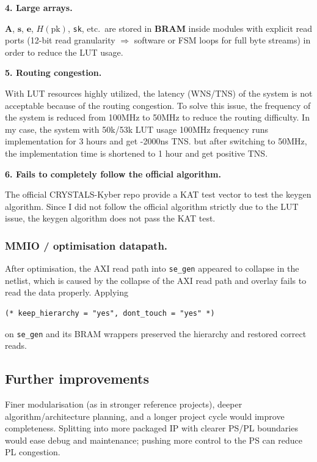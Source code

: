\documentclass[11pt,a4paper]{article}
\begin{document}
\medskip
\noindent \textbf{4. Large arrays.}

\noindent $\mathbf{A}$, $\mathbf{s}$, $\mathbf{e}$, $H(\mathrm{pk})$, \texttt{sk}, etc.\ are stored in \textbf{BRAM} inside modules with explicit read ports (12-bit read granularity $\Rightarrow$ software or FSM loops for full byte streams) in order to reduce the LUT usage.

\medskip
\noindent \textbf{5. Routing congestion.}

\noindent With LUT resources highly utilized, the latency (WNS/TNS) of the system is not acceptable because of the routing congestion. To solve this issue, the frequency of the system is reduced from 100MHz to 50MHz to reduce the routing difficulty. 
In my case, the system with 50k/53k LUT usage 100MHz frequency runs implementation for 3 hours and get -2000ns TNS. but after switching to 50MHz, the implementation time is shortened to 1 hour and get positive TNS.

\medskip
\noindent \textbf{6. Fails to completely follow the official algorithm.}

\noindent The official CRYSTALS-Kyber repo provide a KAT test vector to test the keygen algorithm. Since I did not follow the official algorithm strictly due to the LUT issue, the keygen algorithm does not pass the KAT test.

\subsubsection{MMIO / optimisation datapath.}
After optimisation, the AXI read path into \texttt{se\_gen} appeared to collapse in the netlist, which is caused by the collapse of the AXI read path and overlay fails to read the data properly. Applying
\begin{verbatim}
(* keep_hierarchy = "yes", dont_touch = "yes" *)
\end{verbatim}
on \texttt{se\_gen} and its BRAM wrappers preserved the hierarchy and restored correct reads.

\subsection{Further improvements}
Finer modularisation (as in stronger reference projects), deeper algorithm/architecture planning, and a longer project cycle would improve completeness. Splitting into more packaged IP with clearer PS/PL boundaries would ease debug and maintenance; pushing more control to the PS can reduce PL congestion.
\end{document}
